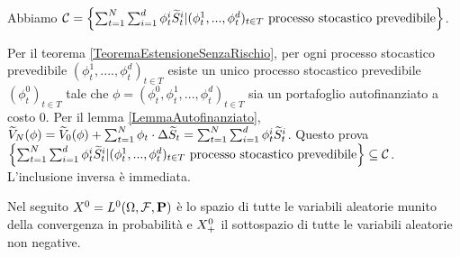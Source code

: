 \begin{Corollary}
	Abbiamo $\mathcal{C} = \left \lbrace \sum_{t = 1}^N \sum_{i = 1}^d \phi^i_t \widetilde{S}^i_t | (\phi^1_t,...,\phi^d_t)_{t \in T}\text{ processo stocastico prevedibile} \right \rbrace$.
\end{Corollary}
\Proof Per il teorema \ref{TeoremaEstensioneSenzaRischio}, per ogni processo stocastico prevedibile $(\phi^1_t,....,\phi^d_t)_{t \in T}$ esiste un unico processo stocastico prevedibile $(\phi^0_t)_{t \in T}$ tale che $\phi = (\phi^0_t,\phi^1_t,...,\phi^d_t)_{t \in T}$ sia un portafoglio autofinanziato a costo $0$. Per il lemma \ref{LemmaAutofinanziato}, $\widetilde{V}_N(\phi) = \widetilde{V}_0(\phi) + \sum_{t = 1}^N \phi_t \cdot \Delta \widetilde{S}_t = \sum_{t = 1}^N \sum_{i = 1}^d \phi^i_t \widetilde{S}^i_t$. Questo prova $\left \lbrace \sum_{t = 1}^N \sum_{i = 1}^d \phi^i_t \widetilde{S}^i_t | (\phi^1_t,...,\phi^d_t)_{t \in T}\text{ processo stocastico prevedibile} \right \rbrace \subseteq \mathcal{C}$. L'inclusione inversa \`e immediata. \EndProof
\par Nel seguito $\RandomVariable^0 = L^0(\SamplesSpace,\SigmaAlgebra,\Probability{})$ \`e lo spazio di tutte le variabili aleatorie munito della convergenza in probabilit\`a e $X^0_+$ il sottospazio di tutte le variabili aleatorie non negative.
